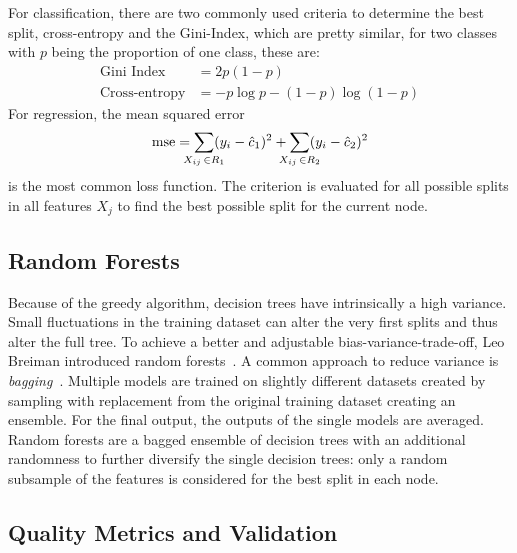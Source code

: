 For classification, there are two commonly used criteria to determine the best split, 
cross-entropy and the Gini-Index, which are pretty similar, for two classes
with $p$ being the proportion of one class, these are:
\begin{align}
  \text{Gini Index} &= 2p(1-p)\\
  \text{Cross-entropy} &= -p\log p - (1 - p) \log(1-p)
\end{align}
For regression, the mean squared error 
\begin{equation}
  \operatorname{mse} = \sum_{\mathclap{X_{ij} \, \in R_1}} (y_i - \hat{c}_1)^2
                     + \sum_{\mathclap{X_{ij} \, \in R_2}} (y_i - \hat{c}_2)^2
\end{equation}
is the most common loss function.
The criterion is evaluated for all possible splits in all features $X_j$ to find 
the best possible split for the current node. \cite[chapter 9.2]{hasties}

\subsection{Random Forests}

Because of the greedy algorithm, decision trees have intrinsically a high variance.
Small fluctuations in the training dataset can alter the very first splits and
thus alter the full tree.
To achieve a better and adjustable bias-variance-trade-off, Leo Breiman introduced
random forests~\cite{randomforest}.
A common approach to reduce variance is \emph{bagging}~\cite{bagging}. 
Multiple models are trained on slightly different datasets created by sampling with replacement from the original training dataset creating an ensemble.
For the final output, the outputs of the single models are averaged.
Random forests are a bagged ensemble of decision trees with an additional randomness
to further diversify the single decision trees: only a random subsample of the
features is considered for the best split in each node.

\subsection{Quality Metrics and Validation}\label{sec:validation}

